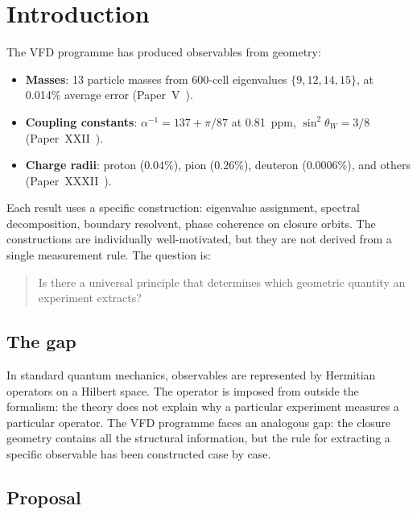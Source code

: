 \documentclass[12pt]{article}
\begin{document}
\section{Introduction}\label{sec:intro}

The VFD programme has produced observables from geometry:

\begin{itemize}
    \item \textbf{Masses}: 13 particle masses from 600-cell eigenvalues $\{9,12,14,15\}$, at 0.014\% average error (Paper~V~\citep{SmartV}).
    \item \textbf{Coupling constants}: $\alpha^{-1} = 137 + \pi/87$ at 0.81~ppm, $\sin^2\theta_W = 3/8$ (Paper~XXII~\citep{SmartXXII}).
    \item \textbf{Charge radii}: proton ($0.04\%$), pion ($0.26\%$), deuteron ($0.0006\%$), and others (Paper~XXXII~\citep{SmartXXXII}).
\end{itemize}

Each result uses a specific construction: eigenvalue assignment, spectral decomposition, boundary resolvent, phase coherence on closure orbits. The constructions are individually well-motivated, but they are not derived from a single measurement rule. The question is:

\begin{quote}
Is there a universal principle that determines which geometric quantity an experiment extracts?
\end{quote}

\subsection*{The gap}

In standard quantum mechanics, observables are represented by Hermitian operators on a Hilbert space. The operator is imposed from outside the formalism: the theory does not explain why a particular experiment measures a particular operator. The VFD programme faces an analogous gap: the closure geometry contains all the structural information, but the rule for extracting a specific observable has been constructed case by case.

\subsection*{Proposal}
\end{document}
